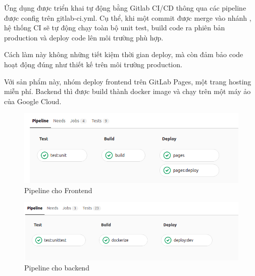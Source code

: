 \documentclass[./../main.tex]{subfiles}
\begin{document}
Ứng dụng được triển khai tự động bằng Gitlab CI/CD thông qua các pipeline được config trên gitlab-ci.yml. Cụ thể, khi một commit được merge vào nhánh , hệ thống CI sẽ tự động chạy toàn bộ unit test, build code ra phiên bản production và deploy code lên môi trường phù hợp.

Cách làm này không những tiết kiệm thời gian deploy, mà còn đảm bảo code hoạt động đúng như thiết kế trên môi trường production.

Với sản phẩm này, nhóm deploy frontend trên GitLab Pages, một trang hosting miễn phí. Backend thì được build thành docker image và chạy trên một máy ảo của Google Cloud.

\begin{figure}[H]
	\centering
	\includegraphics[width=\linewidth]{./images/pipeline_1.png}
	\caption{Pipeline cho Frontend}
\end{figure}

\begin{figure}[H]
	\centering
	\includegraphics[width=\linewidth]{./images/pipeline_2.png}
	\caption{Pipeline cho backend}
\end{figure}
\end{document}
